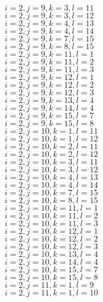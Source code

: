 \documentclass[14pt]{article}
\begin{document}
    $i=2,j=9,k=3,l=11 $ \\ 
    $i=2,j=9,k=3,l=12 $ \\ 
    $i=2,j=9,k=4,l=13 $ \\ 
    $i=2,j=9,k=4,l=14 $ \\ 
    $i=2,j=9,k=7,l=15 $ \\ 
    $i=2,j=9,k=8,l=15 $ \\ 
    $i=2,j=9,k=11,l=1 $ \\ 
    $i=2,j=9,k=11,l=2 $ \\ 
    $i=2,j=9,k=11,l=3 $ \\ 
    $i=2,j=9,k=12,l=1 $ \\ 
    $i=2,j=9,k=12,l=2 $ \\ 
    $i=2,j=9,k=12,l=3 $ \\ 
    $i=2,j=9,k=13,l=4 $ \\ 
    $i=2,j=9,k=14,l=4 $ \\ 
    $i=2,j=9,k=15,l=7 $ \\ 
    $i=2,j=9,k=15,l=8 $ \\ 
    $i=2,j=10,k=1,l=11 $ \\ 
    $i=2,j=10,k=1,l=12 $ \\ 
    $i=2,j=10,k=2,l=11 $ \\ 
    $i=2,j=10,k=2,l=12 $ \\ 
    $i=2,j=10,k=3,l=11 $ \\ 
    $i=2,j=10,k=3,l=12 $ \\ 
    $i=2,j=10,k=4,l=13 $ \\ 
    $i=2,j=10,k=4,l=14 $ \\ 
    $i=2,j=10,k=7,l=15 $ \\ 
    $i=2,j=10,k=8,l=15 $ \\ 
    $i=2,j=10,k=11,l=1 $ \\ 
    $i=2,j=10,k=11,l=2 $ \\ 
    $i=2,j=10,k=11,l=3 $ \\ 
    $i=2,j=10,k=12,l=1 $ \\ 
    $i=2,j=10,k=12,l=2 $ \\ 
    $i=2,j=10,k=12,l=3 $ \\ 
    $i=2,j=10,k=13,l=4 $ \\ 
    $i=2,j=10,k=14,l=4 $ \\ 
    $i=2,j=10,k=15,l=7 $ \\ 
    $i=2,j=10,k=15,l=8 $ \\ 
    $i=2,j=11,k=1,l=9 $ \\ 
    $i=2,j=11,k=1,l=10 $ \\ 
\end{document}
